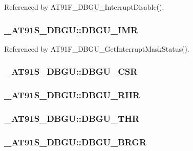 Referenced by AT91F\_\-DBGU\_\-InterruptDisable().\hypertarget{struct__AT91S__DBGU_1a30016762e6cf6a1c2d7558b1092f3e}{
\subsubsection{ {\bf \_\-AT91S\_\-DBGU::DBGU\_\-IMR}}}
\label{struct__AT91S__DBGU_1a30016762e6cf6a1c2d7558b1092f3e}




Referenced by AT91F\_\-DBGU\_\-GetInterruptMaskStatus().\hypertarget{struct__AT91S__DBGU_bb7191eb0dbf277a2c112a49d6100b6b}{
\subsubsection{ {\bf \_\-AT91S\_\-DBGU::DBGU\_\-CSR}}}
\label{struct__AT91S__DBGU_bb7191eb0dbf277a2c112a49d6100b6b}


\hypertarget{struct__AT91S__DBGU_b09ba0a9de6924c76075026b2cd29b15}{
\subsubsection{ {\bf \_\-AT91S\_\-DBGU::DBGU\_\-RHR}}}
\label{struct__AT91S__DBGU_b09ba0a9de6924c76075026b2cd29b15}


\hypertarget{struct__AT91S__DBGU_c541e251a8f6e42eddba11eea5c837b9}{
\subsubsection{ {\bf \_\-AT91S\_\-DBGU::DBGU\_\-THR}}}
\label{struct__AT91S__DBGU_c541e251a8f6e42eddba11eea5c837b9}


\hypertarget{struct__AT91S__DBGU_dc2d66a9b251e35fc29fc3989c3de30a}{
\subsubsection{ {\bf \_\-AT91S\_\-DBGU::DBGU\_\-BRGR}}}
\label{struct__AT91S__DBGU_dc2d66a9b251e35fc29fc3989c3de30a}


